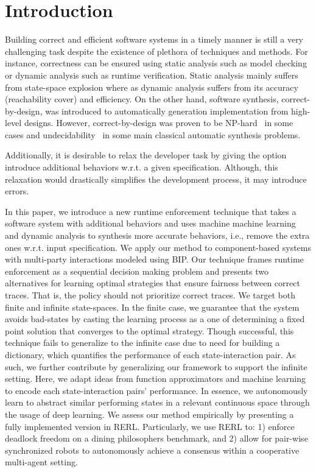 \section{Introduction}
Building correct and efficient software systems in a timely manner is still a very challenging task despite the existence of plethora of techniques and methods. For instance, correctness can be ensured using static analysis such as model checking or dynamic analysis such as runtime verification. Static analysis mainly suffers from state-space explosion where as dynamic analysis suffers from its accuracy (reachability cover) and efficiency.  
%
On the other hand, software synthesis, correct-by-design, was introduced to automatically generation implementation from high-level designs. However, correct-by-design was proven to be NP-hard~\cite{PnueliR89} in some cases and undecidability~\cite{PnueliR90} in some main classical automatic synthesis problems. 

Additionally, it is desirable to relax the developer task by giving the option introduce additional behaviors w.r.t. a given specification. Although,  this relaxation would drastically simplifies the development process, it may introduce errors. 

%
In this paper, we introduce a new runtime enforcement technique that takes a software system with additional behaviors and uses machine machine learning and dynamic analysis to synthesis more accurate behaviors, i.e., remove the extra ones w.r.t. input specification. We apply our method to component-based systems with multi-party interactions modeled using BIP. Our technique frames runtime enforcement as a sequential decision making problem and presents two alternatives for learning optimal strategies that ensure fairness between correct traces. That is, the policy should not prioritize correct traces. We target both finite and infinite state-spaces. In the finite case, we guarantee that the system avoids bad-states by casting the learning process as a one of determining a fixed point solution that converges to the optimal strategy. Though successful, this technique fails to generalize to the infinite case due to need for building a dictionary, which quantifies the performance of each state-interaction pair. As such, we further contribute by generalizing our framework to support the infinite setting. Here, we adapt ideas from function approximators and machine learning to encode each state-interaction pairs' performance. In essence, we autonomously learn to abstract similar performing states in a relevant continuous space through the usage of deep learning. 
We assess our method empirically by presenting a fully implemented version in RERL. Particularly, we use RERL to: 1) enforce deadlock freedom on a dining philosophers benchmark, and 2) allow for pair-wise synchronized robots to autonomously achieve a consensus within a cooperative multi-agent setting. 

